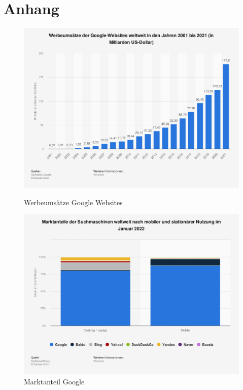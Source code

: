 
\appendix
\renewcommand{\thechapter}{\Alph{chapter}}
\renewcommand{\thesection}{\Roman{section}}
\renewcommand{\thesubsection}{\Roman{section}}

\chapter{Anhang}
\label{appendix:annex}

\begin{figure}
  \includegraphics[width=\textwidth]{figures/appendix/werbeumsatz.png}
  \caption{\label{fig:werbeumsatz} Werbeumsätze Google Websites \cite{alphabetWerbeumsaetzeGoogleWebsitesWeltweit2022}}
  \includegraphics[width=\textwidth]{figures/appendix/marketshare.png}
  \caption{\label{fig:marketshare} Marktanteil Google \cite{netmarketshareMarktanteileSuchmaschinenMobil2022}}
\end{figure}

